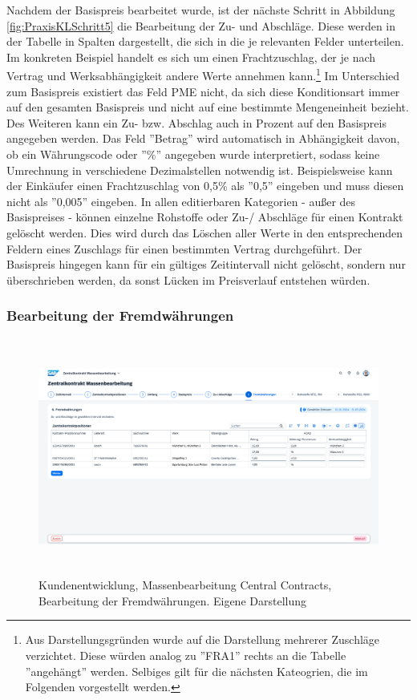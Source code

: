 Nachdem der Basispreis bearbeitet wurde, ist der nächste Schritt in Abbildung \ref{fig:PraxisKLSchritt5} die Bearbeitung der Zu- und Abschläge. Diese werden in der Tabelle in Spalten dargestellt, die sich in die je relevanten Felder unterteilen. Im konkreten Beispiel handelt es sich um einen Frachtzuschlag, der je nach Vertrag und Werksabhängigkeit andere Werte annehmen kann.\footnote{Aus Darstellungsgründen wurde auf die Darstellung mehrerer Zuschläge verzichtet. Diese würden analog zu ''FRA1'' rechts an die Tabelle ''angehängt'' werden. Selbiges gilt für die nächsten Kateogrien, die im Folgenden vorgestellt werden.} Im Unterschied zum Basispreis existiert das Feld PME nicht, da sich diese Konditionsart immer auf den gesamten Basispreis und nicht auf eine bestimmte Mengeneinheit bezieht. Des Weiteren kann ein Zu- bzw. Abschlag auch in Prozent auf den Basispreis angegeben werden. Das Feld ''Betrag'' wird automatisch in Abhängigkeit davon, ob ein Währungscode oder ''\%'' angegeben wurde interpretiert, sodass keine Umrechnung in verschiedene Dezimalstellen notwendig ist. Beispielsweise kann der Einkäufer einen Frachtzuschlag von 0,5\% als ''0,5'' eingeben und muss diesen nicht als ''0,005'' eingeben. In allen editierbaren Kategorien - au\ss er des Basispreises - können \zB einzelne Rohstoffe oder Zu-/ Abschläge für einen Kontrakt gelöscht werden. Dies wird durch das Löschen aller Werte in den entsprechenden Feldern eines Zuschlags für einen bestimmten Vertrag durchgeführt. Der Basispreis hingegen kann für ein gültiges Zeitintervall nicht gelöscht, sondern nur überschrieben werden, da sonst Lücken im Preisverlauf entstehen würden. 

\subsubsection{Bearbeitung der Fremdwährungen}

\begin{figure}[H]
    \centering
    \includegraphics[height=7.78cm]{Bilder/Praxisteil-KL-Schritt-6.png}
    \caption[Kundenentwicklung, Massenbearbeitung Central Contracts, Bearbeitung der Fremdwährungen]{Kundenentwicklung, Massenbearbeitung Central Contracts, Bearbeitung der Fremdwährungen. Eigene Darstellung}
    \label{fig:PraxisKLSchritt6}
\end{figure}

